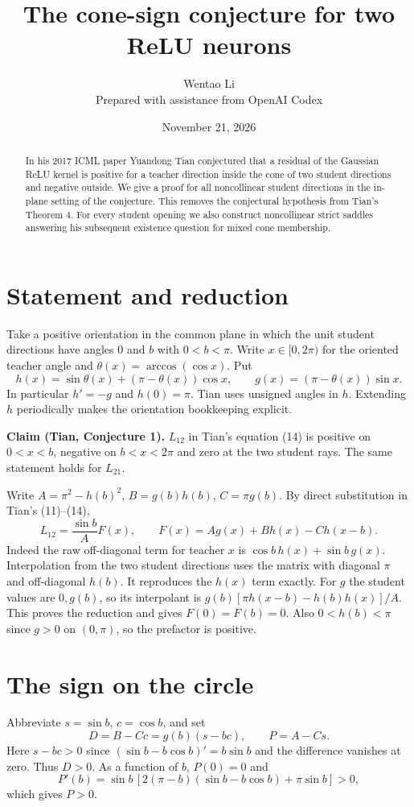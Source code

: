 \documentclass[11pt]{article}
\title{The cone-sign conjecture for two ReLU neurons}
\author{Wentao Li\\\small Prepared with assistance from OpenAI Codex}
\date{November 21, 2026}
\begin{document}
\maketitle
\begin{abstract}
In his 2017 ICML paper Yuandong Tian conjectured that a residual of the Gaussian ReLU kernel is positive for a teacher direction inside the cone of two student directions and negative outside. We give a proof for all noncollinear student directions in the in-plane setting of the conjecture. This removes the conjectural hypothesis from Tian's Theorem 4. For every student opening we also construct noncollinear strict saddles answering his subsequent existence question for mixed cone membership.
\end{abstract}

\section*{Statement and reduction}
Take a positive orientation in the common plane in which the unit student directions have angles $0$ and $b$ with $0<b<\pi$. Write $x\in[0,2\pi)$ for the oriented teacher angle and $\theta(x)=\arccos(\cos x)$. Put
\[
 h(x)=\sin\theta(x)+(\pi-\theta(x))\cos x,\qquad
 g(x)=(\pi-\theta(x))\sin x .
\]
In particular $h'=-g$ and $h(0)=\pi$. Tian uses unsigned angles in $h$. Extending $h$ periodically makes the orientation bookkeeping explicit.

\textbf{Claim (Tian, Conjecture 1).} $L_{12}$ in Tian's equation (14) is positive on $0<x<b$, negative on $b<x<2\pi$ and zero at the two student rays. The same statement holds for $L_{21}$.

Write $A=\pi^2-h(b)^2$, $B=g(b)h(b)$, $C=\pi g(b)$. By direct substitution in Tian's (11)--(14),
\[
 L_{12}=\frac{\sin b}{A}F(x),\qquad
 F(x)=A g(x)+B h(x)-C h(x-b).
\]
Indeed the raw off-diagonal term for teacher $x$ is $\cos b\,h(x)+\sin b\,g(x)$. Interpolation from the two student directions uses the matrix with diagonal $\pi$ and off-diagonal $h(b)$. It reproduces the $h(x)$ term exactly. For $g$ the student values are $0,g(b)$, so its interpolant is $g(b)[\pi h(x-b)-h(b)h(x)]/A$. This proves the reduction and gives $F(0)=F(b)=0$. Also $0<h(b)<\pi$ since $g>0$ on $(0,\pi)$, so the prefactor is positive.

\section*{The sign on the circle}
Abbreviate $s=\sin b$, $c=\cos b$, and set
\[
 D=B-Cc=g(b)(s-bc),\qquad P=A-Cs .
\]
Here $s-bc>0$ since $(\sin b-b\cos b)'=b\sin b$ and the difference vanishes at zero. Thus $D>0$. As a function of $b$, $P(0)=0$ and
\[
 P'(b)=\sin b\,[2(\pi-b)(\sin b-b\cos b)+\pi\sin b]>0,
\]
which gives $P>0$.
\end{document}
